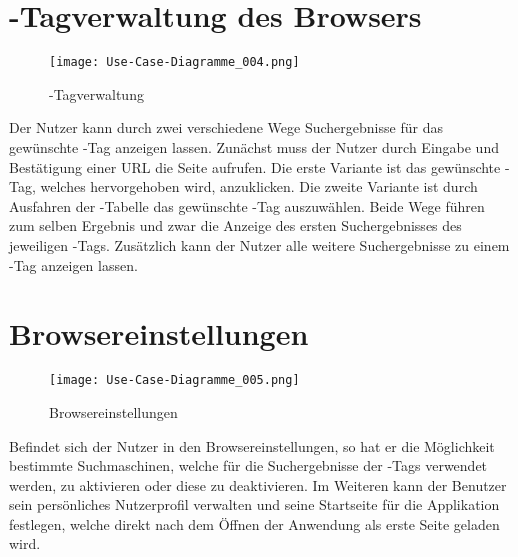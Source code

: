 \section{\SEARCH-Tagverwaltung des Browsers}
\begin{figure}[htb]
\texttt{[image: Use-Case-Diagramme\_004.png]}
	\caption{\SEARCH-Tagverwaltung}
	\label{fig:SEARCH-Tagverwaltung}
\end{figure}
Der Nutzer kann durch zwei verschiedene Wege Suchergebnisse für das gewünschte \SEARCH-Tag anzeigen lassen. Zunächst muss der Nutzer durch Eingabe und Bestätigung einer URL die Seite aufrufen. Die erste Variante ist das gewünschte \SEARCH-Tag, welches hervorgehoben wird, anzuklicken. Die zweite Variante ist durch Ausfahren der \SEARCH-Tabelle das gewünschte \SEARCH-Tag auszuwählen. Beide Wege führen zum selben Ergebnis und zwar die Anzeige des ersten Suchergebnisses des jeweiligen \SEARCH-Tags. Zusätzlich kann der Nutzer alle weitere Suchergebnisse zu einem \SEARCH-Tag anzeigen lassen.

\section{Browsereinstellungen}
\begin{figure}[htb]
\texttt{[image: Use-Case-Diagramme\_005.png]}
	\caption{Browsereinstellungen}
	\label{fig:Browsereinstellungen}
\end{figure}
Befindet sich der Nutzer in den Browsereinstellungen, so hat er die Möglichkeit bestimmte Suchmaschinen, welche für die Suchergebnisse der \SEARCH-Tags verwendet werden, zu aktivieren oder diese zu deaktivieren. Im Weiteren kann der Benutzer sein persönliches Nutzerprofil verwalten und seine Startseite für die Applikation festlegen, welche direkt nach dem Öffnen der Anwendung als erste Seite geladen wird.
